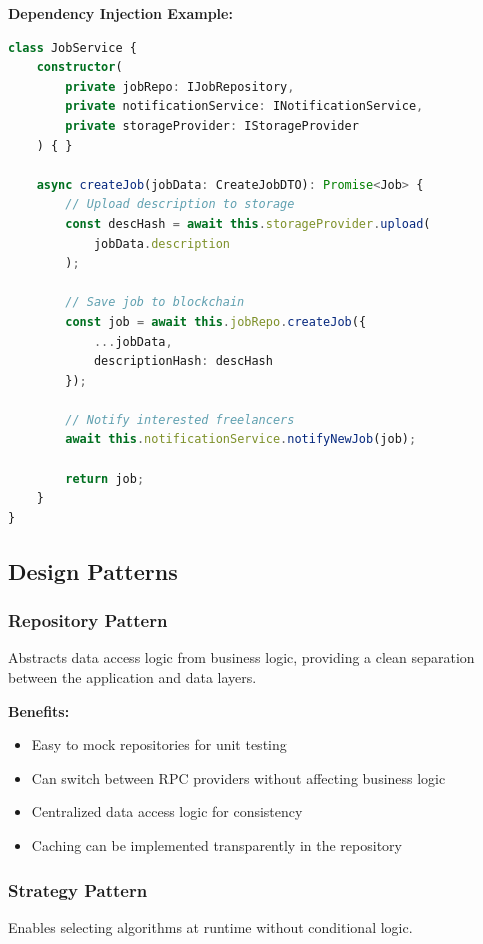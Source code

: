 \documentclass[a4paper,13pt,twoside]{report}
\theoremstyle{definition}
\begin{document}
\textbf{Dependency Injection Example:}
\begin{lstlisting}[language=TypeScript, caption=Constructor Injection]
class JobService {
    constructor(
        private jobRepo: IJobRepository,
        private notificationService: INotificationService,
        private storageProvider: IStorageProvider
    ) { }

    async createJob(jobData: CreateJobDTO): Promise<Job> {
        // Upload description to storage
        const descHash = await this.storageProvider.upload(
            jobData.description
        );

        // Save job to blockchain
        const job = await this.jobRepo.createJob({
            ...jobData,
            descriptionHash: descHash
        });

        // Notify interested freelancers
        await this.notificationService.notifyNewJob(job);

        return job;
    }
}
\end{lstlisting}

\subsection{Design Patterns}

\subsubsection{Repository Pattern}

Abstracts data access logic from business logic, providing a clean separation between the application and data layers.

\textbf{Benefits:}
\begin{itemize}
    \item Easy to mock repositories for unit testing
    \item Can switch between RPC providers without affecting business logic
    \item Centralized data access logic for consistency
    \item Caching can be implemented transparently in the repository
\end{itemize}

\subsubsection{Strategy Pattern}

Enables selecting algorithms at runtime without conditional logic.
\end{document}
